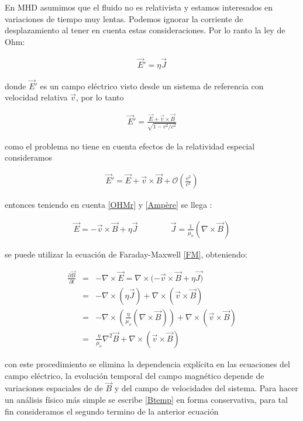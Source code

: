 \medskip

\noindent En MHD asumimos que el fluido no es relativista y estamos interesados en variaciones de tiempo muy lentas. Podemos ignorar la corriente de desplazamiento al tener en cuenta estas consideraciones. Por lo ranto la ley de Ohm\cite{Jackson}:

\begin{eqnarray}
\label{OHMr}
\vec{E}' = \eta\vec{J}
\end{eqnarray}

\noindent donde $\vec{E}'$ es un campo eléctrico visto desde un sistema de referencia con velocidad relativa $\vec{v}$, por lo tanto 

\begin{eqnarray}
\vec{E}' = \frac{\vec{E}+\vec{v}\times\vec{B}}{\sqrt{1-v^{2}/c^{2}}}
\end{eqnarray}

\noindent como el problema no tiene en cuenta efectos de la relatividad especial consideramos 

\begin{eqnarray}
\vec{E}' = \vec{E}+\vec{v}\times\vec{B} + \mathcal{O}\left(\frac{v^{2}}{c^{2}}\right)
\end{eqnarray}

\noindent entonces teniendo en cuenta \eqref{OHMr} y \eqref{Ampère} se llega :

\begin{eqnarray}
\vec{E} = -\vec{v}\times\vec{B}+\eta\vec{J} \qquad \qquad \vec{J} = \frac{1}{\mu_{o}}(\nabla \times \vec{B})
\end{eqnarray}

\noindent se puede utilizar la ecuación de Faraday-Maxwell \eqref{FM}, obteniendo:

\begin{eqnarray}
\label{Btemp}
\frac{\partial \vec{B}}{\partial t} &=& -\nabla \times \vec{E} = \nabla \times(-\vec{v}\times\vec{B}+\eta\vec{J)}\\
&=& -\nabla \times (\eta\vec{J})+\nabla\times(\vec{v}\times\vec{B})\\
&=&-\nabla\times\left(\frac{\eta}{\mu_{o}}(\nabla\times\vec{B})\right) + \nabla\times(\vec{v}\times\vec{B})\\
&=&\frac{\eta}{\mu_{o}}\nabla^{2}\vec{B} + \nabla\times(\vec{v}\times\vec{B})
\end{eqnarray}

\noindent con este procedimiento se elimina la dependencia explícita en las ecuaciones del campo eléctrico, la evolución temporal del campo magnético depende de variaciones espaciales de de $\vec{B}$ y del campo de velocidades del sistema. Para hacer un análisis físico más simple se escribe \eqref{Btemp} en forma conservativa, para tal fin consideramos el segundo termino de la anterior ecuación

